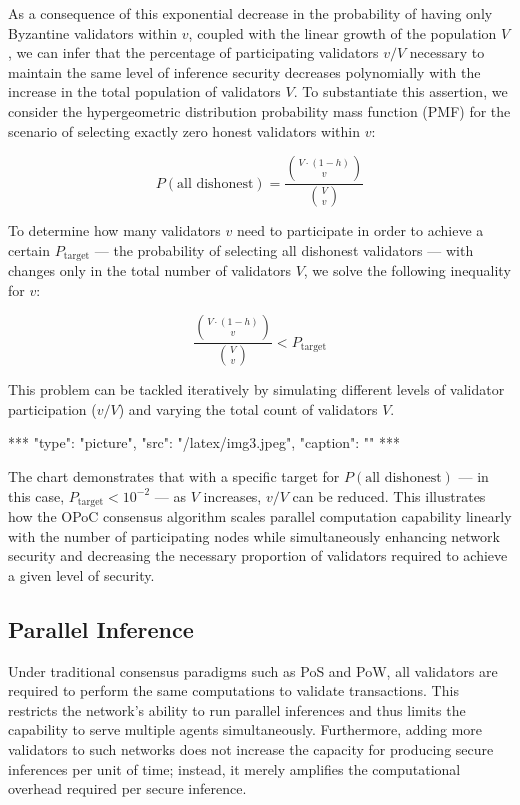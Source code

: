 \documentclass{article}
\begin{document}
As a consequence of this exponential decrease in the probability of having only Byzantine validators within \( v \), coupled with the linear growth of the population \( V \), we can infer that the percentage of participating validators \( v/V \) necessary to maintain the same level of inference security decreases polynomially with the increase in the total population of validators \( V \). To substantiate this assertion, we consider the hypergeometric distribution probability mass function (PMF) for the scenario of selecting exactly zero honest validators within \( v \):

\[ P(\text{all dishonest}) = \frac{{\binom{V \cdot (1 - h)}{v}}}{{\binom{V}{v}}} \]

To determine how many validators \( v \) need to participate in order to achieve a certain \( P_{\text{target}} \) — the probability of selecting all dishonest validators — with changes only in the total number of validators \( V \), we solve the following inequality for \( v \):

\[ \frac{{\binom{V \cdot (1 - h)}{v}}}{{\binom{V}{v}}} < P_{\text{target}} \]

This problem can be tackled iteratively by simulating different levels of validator participation (\( v/V \)) and varying the total count of validators \( V \).

***
"type": "picture",
"src": "/latex/img3.jpeg",
"caption": ""
***

The chart demonstrates that with a specific target for \( P(\text{all dishonest}) \) — in this case, \(P_{\text{target}} < 10^{-2}\) — as \( V \) increases, \( v/V \) can be reduced. This illustrates how the OPoC consensus algorithm scales parallel computation capability linearly with the number of participating nodes while simultaneously enhancing network security and decreasing the necessary proportion of validators required to achieve a given level of security.

\subsection{Parallel Inference}



Under traditional consensus paradigms such as PoS and PoW, all validators are required to perform the same computations to validate transactions. This restricts the network's ability to run parallel inferences and thus limits the capability to serve multiple agents simultaneously. Furthermore, adding more validators to such networks does not increase the capacity for producing secure inferences per unit of time; instead, it merely amplifies the computational overhead required per secure inference.
\end{document}
